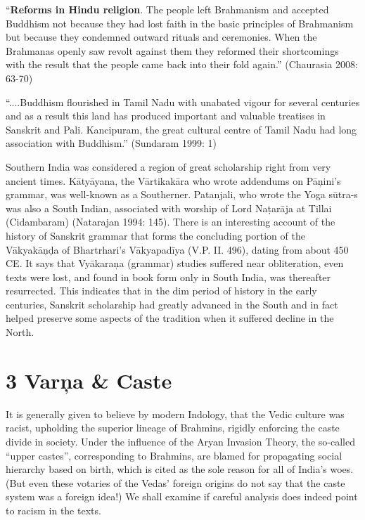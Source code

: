 \vskip 2pt

\begin{myquote}
“\textbf{Reforms in Hindu religion}. The people left Brahmanism and accepted Buddhism not because they had lost faith in the basic principles of Brahmanism but because they condemned outward rituals and ceremonies. When the Brahmanas openly saw revolt against them they reformed their shortcomings with the result that the people came back into their fold again.” (Chaurasia 2008: 63-70)
\end{myquote}

\vskip 2pt

\begin{myquote}
“....Buddhism flourished in Tamil Nadu with unabated vigour for several centuries and as a result this land has produced important and valuable treatises in Sanskrit and Pali. Kancipuram, the great cultural centre of Tamil Nadu had long association with Buddhism.” (Sundaram 1999: 1)
\end{myquote}

\vskip 2pt

Southern India was considered a region of great scholarship right from very ancient times. Kātyāyana, the Vārtikakāra who wrote addendums on Pāņini’s grammar, was well-known as a Southerner. Patanjali, who wrote the Yoga sūtra-s was also a South Indian, associated with worship of Lord Naṭarāja at Tillai (Cidambaram) (Natarajan 1994: 145). There is an interesting account of the history of Sanskrit grammar that forms the concluding portion of the Vākyakāņḍa of Bhartrhari’s Vākyapadīya (V.P. II. 496), dating from about 450 CE. It says that Vyākaraņa (grammar) studies suffered near obliteration, even texts were lost, and found in book form only in South India, was thereafter resurrected. This indicates that in the dim period of history in the early centuries, Sanskrit scholarship had greatly advanced in the South and in fact helped preserve some aspects of the tradition when it suffered decline in the North.

\vskip 2pt


\section*{3 Varņa \& Caste}

It is generally given to believe by modern Indology, that the Vedic culture was racist, upholding the superior lineage of Brahmins, rigidly enforcing the caste divide in society. Under the influence of the Aryan Invasion Theory, the so-called “upper castes”, corresponding to Brahmins, are blamed for propagating social hierarchy based on birth, which is cited as the sole reason for all of India’s woes. (But even these votaries of the Vedas’ foreign origins do not say that the caste system was a foreign idea!) We shall examine if careful analysis does indeed point to racism in the texts.

